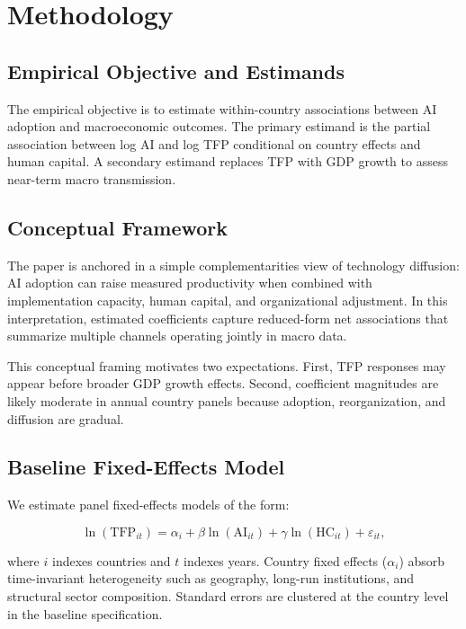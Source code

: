 \section{Methodology}

\subsection{Empirical Objective and Estimands}

The empirical objective is to estimate within-country associations between AI adoption and macroeconomic outcomes. The primary estimand is the partial association between log AI and log TFP conditional on country effects and human capital. A secondary estimand replaces TFP with GDP growth to assess near-term macro transmission.

\subsection{Conceptual Framework}

The paper is anchored in a simple complementarities view of technology diffusion: AI adoption can raise measured productivity when combined with implementation capacity, human capital, and organizational adjustment. In this interpretation, estimated coefficients capture reduced-form net associations that summarize multiple channels operating jointly in macro data.

This conceptual framing motivates two expectations. First, TFP responses may appear before broader GDP growth effects. Second, coefficient magnitudes are likely moderate in annual country panels because adoption, reorganization, and diffusion are gradual.

\subsection{Baseline Fixed-Effects Model}

We estimate panel fixed-effects models of the form:

\[
\ln(\mathrm{TFP}_{it}) = \alpha_i + \beta \ln(\mathrm{AI}_{it}) + \gamma \ln(\mathrm{HC}_{it}) + \varepsilon_{it},
\]

where $i$ indexes countries and $t$ indexes years. Country fixed effects ($\alpha_i$) absorb time-invariant heterogeneity such as geography, long-run institutions, and structural sector composition. Standard errors are clustered at the country level in the baseline specification.

